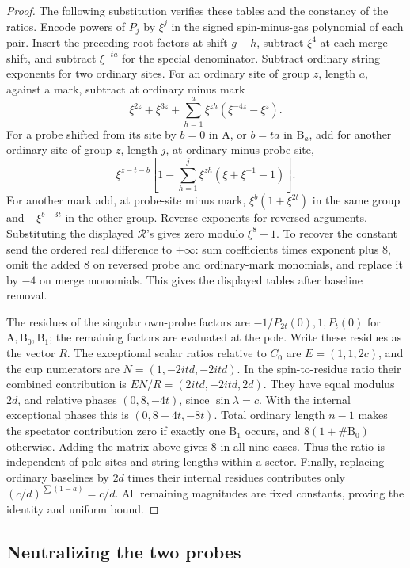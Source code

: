 \begin{proof}
The following substitution verifies these tables and the constancy of
the ratios.  Encode powers of \(P_j\) by \(\xi^j\) in the signed
spin-minus-gas polynomial of each pair.  Insert the preceding root
factors at shift \(g-h\), subtract \(\xi^4\) at each merge shift,
and subtract \(\xi^{-ta}\) for the special denominator.  Subtract
ordinary string exponents for two ordinary sites.  For an ordinary
site of group \(z\), length \(a\), against a mark, subtract at
ordinary minus mark
\[
 \xi^{2z}+\xi^{3z}
                  +\sum_{h=1}^a\xi^{zh}(\xi^{-4z}-\xi^z).
\]
For a probe shifted from its site by \(b=0\) in \(\mathrm A\), or
\(b=ta\) in \(\mathrm B_a\), add for another ordinary site of
group \(z\), length \(j\), at ordinary minus probe-site,
\[
 \xi^{z-t-b}\left[1-
       \sum_{h=1}^j\xi^{zh}(\xi+\xi^{-1}-1)\right].
\]
For another mark add, at probe-site minus mark,
\(\xi^b(1+\xi^{2t})\) in the same group and \(-\xi^{b-3t}\) in
the other group.  Reverse exponents for reversed arguments.  Substituting
the displayed \(\mathcal R\)'s gives zero modulo \(\xi^8-1\).
To recover the constant send the ordered real difference to \(+\infty\):
sum coefficients times exponent plus 8, omit the added 8 on reversed
probe and ordinary-mark monomials, and replace it by \(-4\) on merge
monomials.  This gives the displayed tables after baseline removal.

The residues of the singular own-probe factors are
\(-1/P_{2t}(0),1,P_t(0)\) for
\(\mathrm A,\mathrm B_0,\mathrm B_1\); the remaining factors
are evaluated at the pole.  Write these residues as the vector $R$.
The exceptional scalar ratios relative to $C_0$ are $E=(1,1,2c)$,
and the cup numerators are $N=(1,-2itd,-2itd)$.  In the
spin-to-residue ratio their combined contribution is
$EN/R=(2itd,-2itd,2d)$.  They have equal modulus
\(2d\), and relative phases \((0,8,-4t)\), since
\(\sin\lambda=c\).  With the internal exceptional
phases this is \((0,8+4t,-8t)\).  Total ordinary length \(n-1\)
makes the spectator contribution zero if exactly one \(\mathrm B_1\)
occurs, and \(8(1+\#\mathrm B_0)\) otherwise.  Adding the matrix
above gives 8 in all nine cases.  Thus the ratio is independent of pole
sites and string lengths within a sector.  Finally, replacing ordinary
baselines by \(2d\) times their internal residues contributes only
\((c/d)^{\sum(1-a)}=c/d\).  All remaining magnitudes are fixed
constants, proving the identity and uniform bound.
\end{proof}

\subsection{Neutralizing the two probes}

